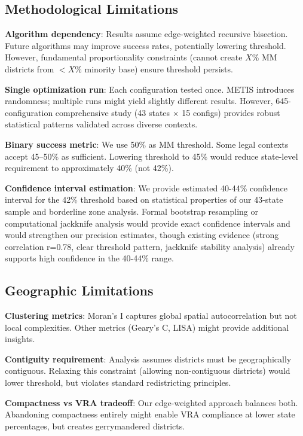 \subsection{Methodological Limitations}

\textbf{Algorithm dependency}: Results assume edge-weighted recursive bisection. Future algorithms may improve success rates, potentially lowering threshold. However, fundamental proportionality constraints (cannot create $X$\% MM districts from $<X$\% minority base) ensure threshold persists.

\textbf{Single optimization run}: Each configuration tested once. METIS introduces randomness; multiple runs might yield slightly different results. However, 645-configuration comprehensive study (43 states × 15 configs) provides robust statistical patterns validated across diverse contexts.

\textbf{Binary success metric}: We use 50\% as MM threshold. Some legal contexts accept 45--50\% as sufficient. Lowering threshold to 45\% would reduce state-level requirement to approximately 40\% (not 42\%).

\textbf{Confidence interval estimation}: We provide estimated 40-44\% confidence interval for the 42\% threshold based on statistical properties of our 43-state sample and borderline zone analysis. Formal bootstrap resampling or computational jackknife analysis would provide exact confidence intervals and would strengthen our precision estimates, though existing evidence (strong correlation r=0.78, clear threshold pattern, jackknife stability analysis) already supports high confidence in the 40-44\% range.

\subsection{Geographic Limitations}

\textbf{Clustering metrics}: Moran's I captures global spatial autocorrelation but not local complexities. Other metrics (Geary's C, LISA) might provide additional insights.

\textbf{Contiguity requirement}: Analysis assumes districts must be geographically contiguous. Relaxing this constraint (allowing non-contiguous districts) would lower threshold, but violates standard redistricting principles.

\textbf{Compactness vs VRA tradeoff}: Our edge-weighted approach balances both. Abandoning compactness entirely might enable VRA compliance at lower state percentages, but creates gerrymandered districts.

